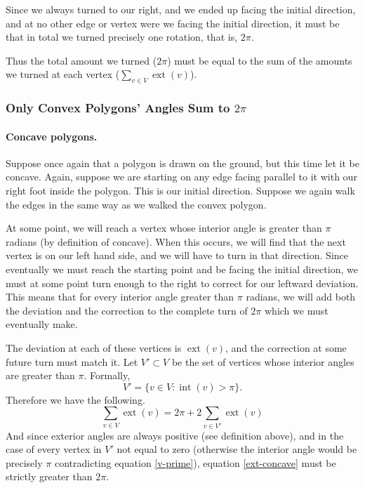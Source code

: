 \documentclass{article}
\newcommand{\inta}[1]{\operatorname{int}\left( #1 \right)} %
\newcommand{\exta}[1]{\operatorname{ext}\left( #1 \right)} %
\begin{document}
Since we always turned to our right, and we ended up facing the initial direction, and at no other edge or vertex were we facing the initial direction, it must be that in total we turned precisely one rotation, that is, \(2\pi\).

Thus the total amount we turned (\(2\pi\)) must be equal to the sum of the amounts we turned at each vertex (\(\sum_{v \in V}\exta{v}\)).

\subsubsection{Only Convex Polygons' Angles Sum to \(2\pi\)}

\paragraph{Concave polygons.} Suppose once again that a polygon is drawn on the ground, but this time let it be concave. Again, suppose we are starting on any edge facing parallel to it with our right foot inside the polygon. This is our initial direction. Suppose we again walk the edges in the same way as we walked the convex polygon.

At some point, we will reach a vertex whose interior angle is greater than \(\pi\) radians (by definition of concave). When this occurs, we will find that the next vertex is on our left hand side, and we will have to turn in that direction. Since eventually we must reach the starting point and be facing the initial direction, we must at some point turn enough to the right to correct for our leftward deviation. This means that for every interior angle greater than \(\pi\) radians, we will add both the deviation and the correction to the complete turn of \(2\pi\) which we must eventually make.

The deviation at each of these vertices is \(\exta{v}\), and the correction at some future turn must match it. Let \(V' \subset V\) be the set of vertices whose interior angles are greater than \(\pi\). Formally,
\begin{equation}
	V' = \{ v \in V : \inta{v} > \pi \}.
	\label{v-prime}
\end{equation}
Therefore we have the following.
\begin{equation}
	\sum_{v \in V} \exta{v} = 2\pi + 2\sum_{v \in V'} \exta{v}
	\label{ext-concave}
\end{equation}
And since exterior angles are always positive (see definition above), and in the case of every vertex in \(V'\) not equal to zero (otherwise the interior angle would be precisely \(\pi\) contradicting equation \ref{v-prime}), equation \ref{ext-concave} must be strictly greater than \(2\pi\).
\end{document}
